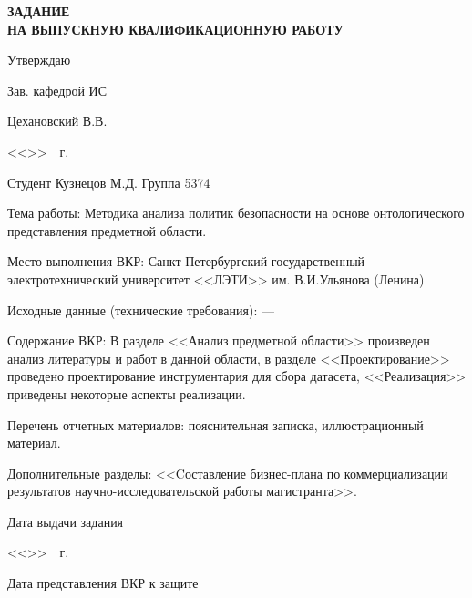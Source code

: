 \documentclass[../main]{subfiles}
\begin{document}
\newpage

\begin{titlepage}
    \centering
        
    \MakeUppercase{\bfseries\large
        задание\\
        на выпускную квалификационную работу
    }

    \vspace{4mm}

    \hfill Утверждаю

    \hfill Зав. кафедрой ИС

    \hfill {} Цехановский В.В.

    \hfill <<\underline{\hspace{1cm}}>>\underline{\hspace{5cm}}~\the\year~г.

    \vspace{4mm}

    \parbox[t]{\textwidth}{
        Студент Кузнецов М.Д. \hfill Группа 5374

        Тема работы: Методика анализа политик безопасности на основе онтологического представления предметной области.

        Место выполнения ВКР: Санкт-Петербургский государственный электротехнический университет 
        <<ЛЭТИ>> им. В.И.Ульянова (Ленина)
        
        Исходные данные (технические требования): ---

        Содержание ВКР: В разделе <<Анализ предметной области>> произведен анализ литературы и работ в данной области, в разделе <<Проектирование>> проведено проектирование инструментария для сбора датасета, <<Реализация>> приведены некоторые аспекты реализации.

        Перечень отчетных материалов: пояснительная записка, иллюстрационный материал.

        Дополнительные разделы: <<Cоставление бизнес-плана по коммерциализации результатов научно-исследовательской работы магистранта>>.
    }

    \vfill

    \begin{minipage}[t]{6cm}
        Дата выдачи задания

        <<\underline{\hspace{1cm}}>>\underline{\hspace{3cm}}~\the\year~г.
    \end{minipage}
    \hfill
    \begin{minipage}[t]{8cm}
        Дата представления ВКР к защите


\end{minipage}
\end{titlepage}
\end{document}
